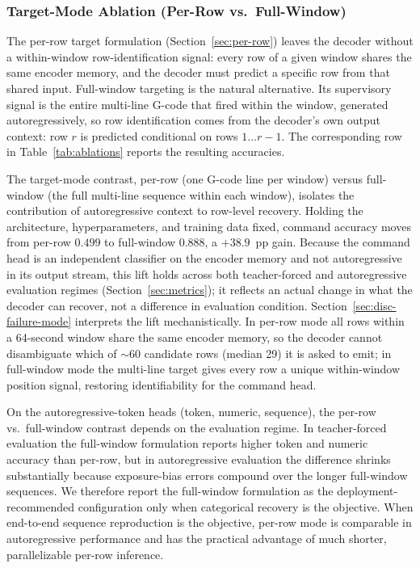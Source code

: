 \documentclass[sensors,article,submit,moreauthors,pdftex]{Definitions/mdpi}
\begin{document}
\subsubsection{Target-Mode Ablation (Per-Row vs.\ Full-Window)}
\label{sec:abl-target-mode}

The per-row target formulation (Section~\ref{sec:per-row}) leaves the decoder without a within-window row-identification signal: every row of a given window shares the same encoder memory, and the decoder must predict a specific row from that shared input. Full-window targeting is the natural alternative. Its supervisory signal is the entire multi-line G-code that fired within the window, generated autoregressively, so row identification comes from the decoder's own output context: row $r$ is predicted conditional on rows $1\!\dots\!r-1$. The corresponding row in Table~\ref{tab:ablations} reports the resulting accuracies.

The target-mode contrast, per-row (one G-code line per window) versus full-window (the full multi-line sequence within each window), isolates the contribution of autoregressive context to row-level recovery. Holding the architecture, hyperparameters, and training data fixed, command accuracy moves from per-row $0.499$ to full-window $0.888$, a $+38.9$~pp gain. Because the command head is an independent classifier on the encoder memory and not autoregressive in its output stream, this lift holds across both teacher-forced and autoregressive evaluation regimes (Section~\ref{sec:metrics}); it reflects an actual change in what the decoder can recover, not a difference in evaluation condition. Section~\ref{sec:disc-failure-mode} interprets the lift mechanistically. In per-row mode all rows within a 64-second window share the same encoder memory, so the decoder cannot disambiguate which of $\sim$60 candidate rows (median 29) it is asked to emit; in full-window mode the multi-line target gives every row a unique within-window position signal, restoring identifiability for the command head.

On the autoregressive-token heads (token, numeric, sequence), the per-row vs.\ full-window contrast depends on the evaluation regime. In teacher-forced evaluation the full-window formulation reports higher token and numeric accuracy than per-row, but in autoregressive evaluation the difference shrinks substantially because exposure-bias errors compound over the longer full-window sequences. We therefore report the full-window formulation as the deployment-recommended configuration only when categorical recovery is the objective. When end-to-end sequence reproduction is the objective, per-row mode is comparable in autoregressive performance and has the practical advantage of much shorter, parallelizable per-row inference.
\end{document}
